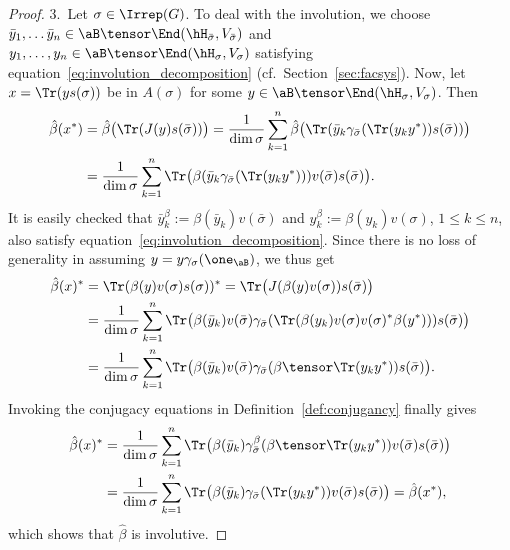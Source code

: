 \begin{proof}
3.~Let $\sigma \in \Irrep(G)$.
		To deal with the involution, we choose $\bar y_1, \dots \bar y_n \in \aB \tensor \End(\hH_{\bar\sigma}, V_{\bar\sigma})$ and $y_1, \dots, y_n \in \aB \tensor \End(\hH_\sigma, V_\sigma)$ satisfying equation~\eqref{eq:involution_decomposition} (cf.~Section~\ref{sec:facsys}).
		Now, let $x = \Tr ( y s(\sigma) )$ be in $A(\sigma)$ for some $y \in \aB \tensor \End(\hH_\sigma, V_\sigma)$.
		Then
		\begin{align*}
			\hat\beta(x^*)
			&= \hat\beta \bigl( \Tr ( J(y) s(\bar \sigma) ) \bigr)
			= \frac{1}{\dim \sigma} \sum_{k=1}^n \hat\beta \bigl( \Tr ( \bar y_k \gamma_{\bar\sigma} (\Tr(y_k y^*) ) s(\bar \sigma) ) \bigr)
			\\
			&=
			\frac{1}{\dim \sigma} \sum_{k=1}^n \Tr \bigl( \beta ( \bar y_k \gamma_{\bar \sigma} ( \Tr(y_k y^*) ) ) v(\bar \sigma) s(\bar\sigma) \bigr).
		\end{align*}
		It is easily checked that $\bar y_k^\beta := \beta(\bar y_k) v(\bar\sigma)$ and $y_k^\beta := \beta(y_k)v(\sigma)$, $1 \le k \le n$, also satisfy equation~\eqref{eq:involution_decomposition}.
		Since there is no loss of generality in assuming $y = y \gamma_\sigma(\one_\aB)$, we thus get
		\begin{align*}
			\hat\beta(x)^*
			&= \Tr ( \beta(y) v(\sigma) s(\sigma) )^*
			= \Tr \bigl( J ( \beta(y) v(\sigma) ) s(\bar\sigma) \bigr)
			\\
			&=
			\frac{1}{\dim \sigma} \sum_{k=1}^n \Tr \bigl( \beta(\bar y_k) v(\bar\sigma) \gamma_{\bar\sigma} ( \Tr ( \beta(y_k) v(\sigma) v(\sigma)^* \beta(y^*) ) ) s(\bar \sigma) \bigr)
			\\
			&=
			\frac{1}{\dim \sigma} \sum_{k=1}^n \Tr \bigl( \beta(\bar y_k) v(\bar\sigma) \gamma_{\bar\sigma} ( \beta \tensor \Tr( y_k y^*) ) s(\bar \sigma) \bigr).
		\end{align*}
		Invoking the conjugacy equations in Definition~\ref{def:conjugancy} finally gives
		\begin{align*}
			\hat\beta(x)^*
			&=
			\frac{1}{\dim \sigma} \sum_{k=1}^n \Tr \bigl( \beta(\bar y_k) \gamma^\beta_{\bar\sigma} ( \beta \tensor \Tr( y_k y^*) ) v(\bar\sigma) s(\bar \sigma) \bigr)
			\\
			&=
			\frac{1}{\dim \sigma} \sum_{k=1}^n \Tr \bigl( \beta ( \bar y_k) \gamma_{\bar\sigma}( \Tr( y_k y^*) ) v(\bar\sigma) s(\bar \sigma)\bigr)
			= \hat\beta(x^*),
		\end{align*}
		which shows that $\hat \beta$ is involutive.
\end{proof}

